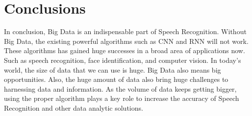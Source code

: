 \documentclass[sigconf]{acmart}
\begin{document}
\section{Conclusions}

In conclusion, Big Data is an indispensable part of Speech Recognition. Without Big Data, the existing powerful algorithms such as CNN and RNN will not work. These algorithms has gained huge successes in a broad area of applications now. Such as speech recognition, face identification, and computer vision. In today's world, the size of data that we can use is huge. Big Data also means big opportunities. Also, the huge amount of data also bring huge challenges to harnessing data and information. As the volume of data keeps getting bigger, using the proper algorithm plays a key role to increase the accuracy of Speech Recognition and other data analytic solutions.



 


\end{document}
